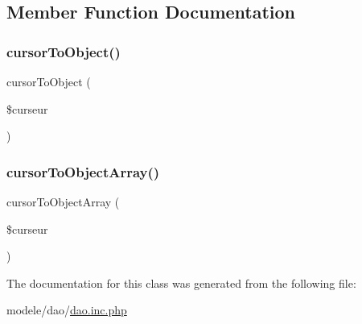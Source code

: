 \subsection{Member Function Documentation}
\mbox{\label{class_d_a_o_a1d3992ba69ebcdf34a867e742fb62c14}} 
\subsubsection{\texorpdfstring{cursor\+To\+Object()}{cursorToObject()}}
{\footnotesize\ttfamily cursor\+To\+Object (\begin{DoxyParamCaption}\item[{}]{\$curseur }\end{DoxyParamCaption})\hspace{0.3cm}{\ttfamily [protected]}}

\mbox{\label{class_d_a_o_a549647c3d73fee1b928cfe2c65885fe7}} 
\subsubsection{\texorpdfstring{cursor\+To\+Object\+Array()}{cursorToObjectArray()}}
{\footnotesize\ttfamily cursor\+To\+Object\+Array (\begin{DoxyParamCaption}\item[{}]{\$curseur }\end{DoxyParamCaption})\hspace{0.3cm}{\ttfamily [protected]}}



The documentation for this class was generated from the following file\+:\begin{DoxyCompactItemize}
\item 
modele/dao/\hyperlink{dao_8inc_8php}{dao.\+inc.\+php}\end{DoxyCompactItemize}
